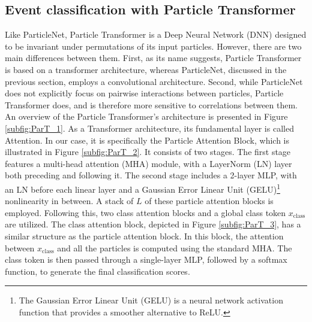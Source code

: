 \subsection{\label{subsec:ParT}Event classification with Particle Transformer}
\noindent Like ParticleNet, Particle Transformer is a Deep Neural Network (DNN) designed to be invariant under permutations of its input particles. However, there are two main differences between them. First, as its name suggests, Particle Transformer is based on a transformer architecture, whereas ParticleNet, discussed in the previous section, employs a convolutional architecture. Second, while ParticleNet does not explicitly focus on pairwise interactions between particles, Particle Transformer does, and is therefore more sensitive to correlations between them.\\
\indent An overview of the Particle Transformer's architecture is presented in Figure \ref{subfig:ParT_1}. As a Transformer architecture, its fundamental layer is called Attention. In our case, it is specifically the Particle Attention Block, which is illustrated in Figure \ref{subfig:ParT_2}. It consists of two stages. The first stage features a multi-head attention (MHA) module, with a LayerNorm (LN) layer both preceding and following it. The second stage includes a 2-layer MLP, with an LN before each linear layer and a Gaussian Error Linear Unit (GELU)\footnote{The Gaussian Error Linear Unit (GELU) is a neural network activation function that provides a smoother alternative to ReLU.} nonlinearity in between. A stack of $L$ of these particle attention blocks is employed. Following this, two class attention blocks and a global class token $x_{\text{class}}$ are utilized. The class attention block, depicted in Figure \ref{subfig:ParT_3}, has a similar structure as the particle attention block. In this block, the attention between $x_{\text{class}}$ and all the particles is computed using the standard MHA. The class token is then passed through a single-layer MLP, followed by a softmax function, to generate the final classification scores.












